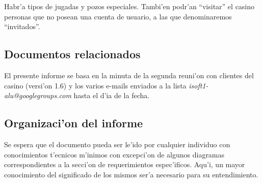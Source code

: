 Habr'a tipos de jugadas y pozos especiales. Tambi'en podr'an ``visitar'' el casino personas que no posean una cuenta de usuario, a las que denominaremos ``invitados''.


\subsection{ Documentos relacionados}
El presente informe se basa en la minuta de la segunda reuni'on con clientes del casino (versi'on 1.6) y los varios e-mails enviados a la lista \textit{isoft1-alu@googlegroups.com} hasta el d'ia de la fecha.


\subsection{ Organizaci'on del informe	}
Se espera que el documento pueda ser le'ido por cualquier individuo con conocimientos t'ecnicos m'inimos con excepci'on de algunos diagramas correspondientes a la secci'on de requerimientos espec'ificos. Aqu'i, un mayor conocimiento del significado de los mismos ser'a necesario para su entendimiento.



